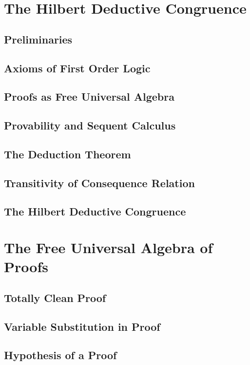 \documentclass{report}
\begin{document}
\section{The Hilbert Deductive Congruence}
    \subsection{Preliminaries}
      
    \subsection{Axioms of First Order Logic}
      
    \subsection{Proofs as Free Universal Algebra}
      
    \subsection{Provability and Sequent Calculus}
      
    \subsection{The Deduction Theorem}
      
    \subsection{Transitivity of Consequence Relation}
      
    \subsection{The Hilbert Deductive Congruence}
      
\section{The Free Universal Algebra of Proofs}
    \subsection{Totally Clean Proof}
      
    \subsection{Variable Substitution in Proof}
      
    \subsection{Hypothesis of a Proof}
      
\end{document}
